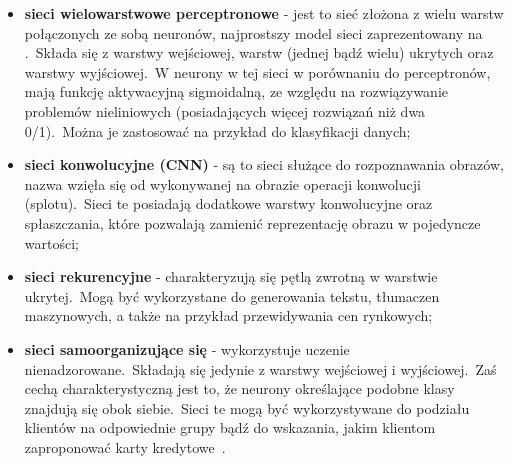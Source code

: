 \begin{itemize}
    \item \textbf{sieci wielowarstwowe perceptronowe} - jest to sieć złożona z wielu warstw połączonych ze sobą neuronów, najprostszy model sieci zaprezentowany na .\ Składa się z warstwy wejściowej, warstw (jednej bądź wielu) ukrytych oraz warstwy wyjściowej.\ W neurony w tej sieci w porównaniu do perceptronów, mają funkcję aktywacyjną sigmoidalną, ze względu na rozwiązywanie problemów nieliniowych (posiadających więcej rozwiązań niż dwa 0/1).\ Można je zastosować na przykład do klasyfikacji danych;
    \item \textbf{sieci konwolucyjne (CNN)} - są to sieci służące do rozpoznawania obrazów, nazwa wzięła się od wykonywanej na obrazie operacji konwolucji (splotu).\ Sieci te posiadają dodatkowe warstwy konwolucyjne oraz spłaszczania, które pozwalają zamienić reprezentację obrazu w pojedyncze wartości;
    \item \textbf{sieci rekurencyjne} - charakteryzują się pętlą zwrotną w warstwie ukrytej.\ Mogą być wykorzystane do generowania tekstu, tłumaczen maszynowych, a także na przykład przewidywania cen rynkowych;
    \item \textbf{sieci samoorganizujące się} - wykorzystuje uczenie nienadzorowane.\ Składają się jedynie z warstwy wejściowej i wyjściowej.\ Zaś cechą charakterystyczną jest to, że neurony określające podobne klasy znajdują się obok siebie.\ Sieci te mogą być wykorzystywane do podziału klientów na odpowiednie grupy bądź do wskazania, jakim klientom zaproponować karty kredytowe~\cite{IBMNetwork, BartosSOM}.
\end{itemize}

